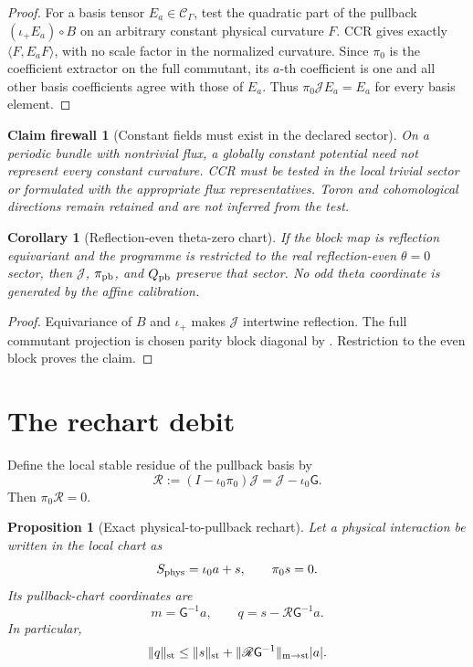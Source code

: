 \documentclass[11pt,oneside]{book}
\newtheorem{proposition}[theorem]{Proposition}
\newtheorem{corollary}[theorem]{Corollary}
\newtheorem{firewall}[theorem]{Claim firewall}
\theoremstyle{definition}
\theoremstyle{remark}
\begin{document}
\begin{proof}
For a basis tensor \(E_a\in{\mathcal C}_\Gamma\), test the quadratic
part of the pullback
\((\iota_+E_a)\circ B\) on an arbitrary constant physical curvature
\(F\).  CCR gives exactly
\(\langle F,E_aF\rangle\), with no scale factor in the normalized
curvature.  Since \(\pi_0\) is the coefficient extractor on the full
commutant, its \(a\)-th coefficient is one and all other basis
coefficients agree with those of \(E_a\).  Thus
\(\pi_0{\mathscr J}E_a=E_a\) for every basis element.
\end{proof}

\begin{firewall}[Constant fields must exist in the declared sector]
\label{fire:e8v9-CCR}
On a periodic bundle with nontrivial flux, a globally constant
potential need not represent every constant curvature.  CCR must be
tested in the local trivial sector or formulated with the appropriate
flux representatives.  Toron and cohomological directions remain
retained and are not inferred from the test.
\end{firewall}

\begin{corollary}[Reflection-even theta-zero chart]
\label{cor:e8v9-reflection}
If the block map is reflection equivariant and the programme is
restricted to the real reflection-even \(\theta=0\) sector, then
\({\mathscr J}\), \(\pi_{\rm pb}\), and \(Q_{\rm pb}\) preserve that
sector.  No odd theta coordinate is generated by the affine
calibration.
\end{corollary}

\begin{proof}
Equivariance of \(B\) and \(\iota_+\) makes
\({\mathscr J}\) intertwine reflection.  The full commutant projection
is chosen parity block diagonal by
.  Restriction to the even block proves the
claim.
\end{proof}

\section{The rechart debit}
\label{sec:e8v9-rechart}

Define the local stable residue of the pullback basis by
\[
 {\mathscr R}:=
 (I-\iota_0\pi_0){\mathscr J}
 ={\mathscr J}-\iota_0{\mathsf G}.                  \label{eq:e8v9-R}
\]
Then \(\pi_0{\mathscr R}=0\).

\begin{proposition}[Exact physical-to-pullback rechart]
\label{prop:e8v9-rechart}
Let a physical interaction be written in the local chart as
\[
 S_{\rm phys}=\iota_0a+s,\qquad \pi_0s=0.            \label{eq:e8v9-local-action}
\]
Its pullback-chart coordinates are
\[
 m={\mathsf G}^{-1}a,\qquad
 q=s-{\mathscr R}{\mathsf G}^{-1}a.                 \label{eq:e8v9-rechart}
\]
In particular,
\[
 \|q\|_{\rm st}
 \le\|s\|_{\rm st}
 +\|{\mathscr R}{\mathsf G}^{-1}\|_{\rm m\to st}|a|.
                                                        \label{eq:e8v9-rechart-bound}
\]
\end{proposition}
\end{document}
